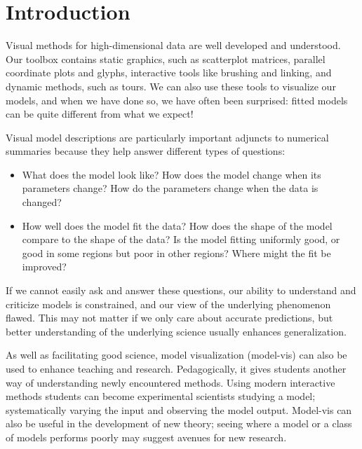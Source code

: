 \documentclass[preprint]{imsart}
\begin{document}
\section{Introduction}

Visual methods for high-dimensional data are well developed and understood. Our toolbox contains static graphics, such as scatterplot matrices, parallel coordinate plots and glyphs, interactive tools like brushing and linking, and dynamic methods, such as tours. We can also use these tools to visualize our models, and when we have done so, we have often been surprised: fitted models can be quite different from what we expect!

Visual model descriptions are  particularly important adjuncts to numerical summaries because they help answer different types of questions:

\begin{itemize} \itemsep 0in

\item What does the model look like? How does the model change when
  its parameters change? How do the parameters change when the
  data is changed?

\item How well does the model fit the data? How does the shape of the
  model compare to the shape of the data?  Is the model fitting
  uniformly good, or good in some regions but poor in other regions?
  Where might the fit be improved?

\end{itemize}

\noindent If we cannot easily ask and answer these questions, our ability to understand and criticize models is constrained, and our view of the underlying phenomenon flawed. This may not matter if we only care about accurate predictions, but better understanding of the underlying science  usually enhances generalization.

As well as facilitating good science, model visualization (model-vis) can also be used to enhance teaching and research. Pedagogically, it gives students another way of understanding newly encountered methods. Using modern interactive methods students can become experimental scientists studying a model; systematically varying the input and observing the model output. Model-vis can also be useful in the development of new theory; seeing where a model or a class of models performs poorly may suggest avenues for new research.

\end{document}
